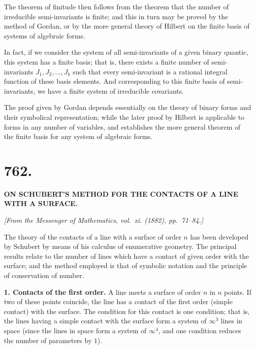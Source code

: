 \documentclass[12pt,a4paper]{article}
\begin{document}
The theorem of finitude then follows from the theorem that the number of
irreducible semi-invariants is finite; and this in turn may be proved by the
method of Gordan, or by the more general theory of Hilbert on the finite
basis of systems of algebraic forms.

In fact, if we consider the system of all semi-invariants of a given binary
quantic, this system has a finite basis; that is, there exists a finite number
of semi-invariants $J_1, J_2, \ldots, J_k$ such that every semi-invariant is a rational
integral function of these basis elements. And corresponding to this finite
basis of semi-invariants, we have a finite system of irreducible covariants.

The proof given by Gordan depends essentially on the theory of binary
forms and their symbolical representation; while the later proof by Hilbert
is applicable to forms in any number of variables, and establishes the more
general theorem of the finite basis for any system of algebraic forms.

\newpage


\section*{762.}

\begin{center}
\textbf{ON SCHUBERT'S METHOD FOR THE CONTACTS OF A LINE WITH A SURFACE.}
\end{center}

\begin{flushright}
\textit{[From the Messenger of Mathematics, vol.~xi. (1882), pp.~71--84.]}
\end{flushright}

The theory of the contacts of a line with a surface of order $n$ has been
developed by Schubert by means of his calculus of enumerative geometry.
The principal results relate to the number of lines which have a contact
of given order with the surface; and the method employed is that of
symbolic notation and the principle of conservation of number.

\textbf{1. Contacts of the first order.} A line meets a surface of order $n$ in $n$
points. If two of these points coincide, the line has a contact of the first
order (simple contact) with the surface. The condition for this contact is
one condition; that is, the lines having a simple contact with the surface
form a system of $\infty^3$ lines in space (since the lines in space form a system
of $\infty^4$, and one condition reduces the number of parameters by $1$).
\end{document}
